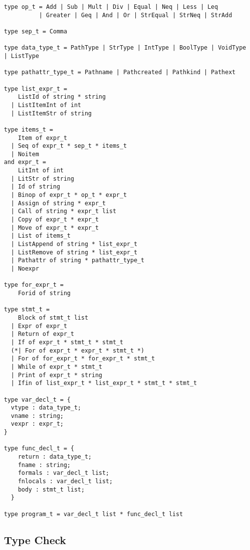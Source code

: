 \documentclass[11pt]{article}
\begin{document}
\begin{listing}[H]
  \begin{verbatim}
type op_t = Add | Sub | Mult | Div | Equal | Neq | Less | Leq
          | Greater | Geq | And | Or | StrEqual | StrNeq | StrAdd

type sep_t = Comma

type data_type_t = PathType | StrType | IntType | BoolType | VoidType | ListType

type pathattr_type_t = Pathname | Pathcreated | Pathkind | Pathext

type list_expr_t =
    ListId of string * string
  | ListItemInt of int
  | ListItemStr of string

type items_t =
    Item of expr_t
  | Seq of expr_t * sep_t * items_t
  | Noitem
and expr_t =
    LitInt of int
  | LitStr of string
  | Id of string
  | Binop of expr_t * op_t * expr_t
  | Assign of string * expr_t
  | Call of string * expr_t list
  | Copy of expr_t * expr_t
  | Move of expr_t * expr_t
  | List of items_t
  | ListAppend of string * list_expr_t
  | ListRemove of string * list_expr_t
  | Pathattr of string * pathattr_type_t
  | Noexpr

type for_expr_t =
    Forid of string

type stmt_t =
    Block of stmt_t list
  | Expr of expr_t
  | Return of expr_t
  | If of expr_t * stmt_t * stmt_t
  (*| For of expr_t * expr_t * stmt_t *)
  | For of for_expr_t * for_expr_t * stmt_t
  | While of expr_t * stmt_t
  | Print of expr_t * string
  | Ifin of list_expr_t * list_expr_t * stmt_t * stmt_t

type var_decl_t = {
  vtype : data_type_t;
  vname : string;
  vexpr : expr_t;
}

type func_decl_t = {
    return : data_type_t;
    fname : string;
    formals : var_decl_t list;
    fnlocals : var_decl_t list;
    body : stmt_t list;
  }

type program_t = var_decl_t list * func_decl_t list
  \end{verbatim}
\end{listing}

\newpage

\subsection{Type Check}
\end{document}
